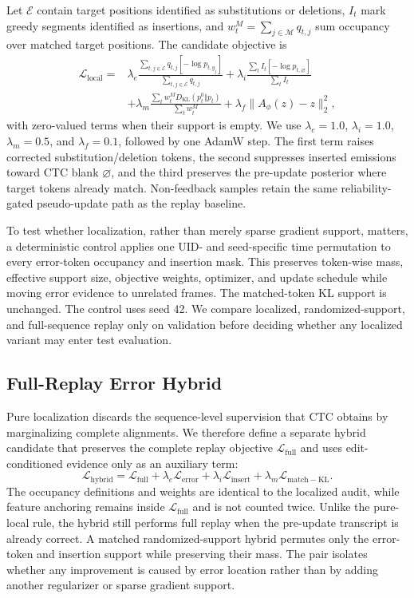 Let $\mathcal E$ contain target positions identified as substitutions or deletions, $I_t$ mark greedy segments identified as insertions, and $w_t^{M}=\sum_{j\in\mathcal M}q_{t,j}$ sum occupancy over matched target positions. The candidate objective is
\begin{align}
\mathcal L_{\mathrm{local}}={}&
\lambda_e\frac{\sum_{t,j\in\mathcal E}q_{t,j}[-\log p_{t,y_j}]}{\sum_{t,j\in\mathcal E}q_{t,j}}
+\lambda_i\frac{\sum_t I_t[-\log p_{t,\varnothing}]}{\sum_t I_t}\nonumber\\
&+\lambda_m\frac{\sum_t w_t^M D_{\mathrm{KL}}(p_t^0\Vert p_t)}{\sum_t w_t^M}
+\lambda_f\lVert A_\phi(z)-z\rVert_2^2,
\end{align}
with zero-valued terms when their support is empty. We use $\lambda_e=1.0$, $\lambda_i=1.0$, $\lambda_m=0.5$, and $\lambda_f=0.1$, followed by one AdamW step. The first term raises corrected substitution/deletion tokens, the second suppresses inserted emissions toward CTC blank $\varnothing$, and the third preserves the pre-update posterior where target tokens already match. Non-feedback samples retain the same reliability-gated pseudo-update path as the replay baseline.

To test whether localization, rather than merely sparse gradient support, matters, a deterministic control applies one UID- and seed-specific time permutation to every error-token occupancy and insertion mask. This preserves token-wise mass, effective support size, objective weights, optimizer, and update schedule while moving error evidence to unrelated frames. The matched-token KL support is unchanged. The control uses seed 42. We compare localized, randomized-support, and full-sequence replay only on validation before deciding whether any localized variant may enter test evaluation.

\subsection{Full-Replay Error Hybrid}

Pure localization discards the sequence-level supervision that CTC obtains by marginalizing complete alignments. We therefore define a separate hybrid candidate that preserves the complete replay objective $\mathcal L_{\mathrm{full}}$ and uses edit-conditioned evidence only as an auxiliary term:
\begin{equation}
  \mathcal L_{\mathrm{hybrid}}=
  \mathcal L_{\mathrm{full}}+
  \lambda_e\mathcal L_{\mathrm{error}}+
  \lambda_i\mathcal L_{\mathrm{insert}}+
  \lambda_m\mathcal L_{\mathrm{match-KL}}.
\end{equation}
The occupancy definitions and weights are identical to the localized audit, while feature anchoring remains inside $\mathcal L_{\mathrm{full}}$ and is not counted twice. Unlike the pure-local rule, the hybrid still performs full replay when the pre-update transcript is already correct. A matched randomized-support hybrid permutes only the error-token and insertion support while preserving their mass. The pair isolates whether any improvement is caused by error location rather than by adding another regularizer or sparse gradient support.


